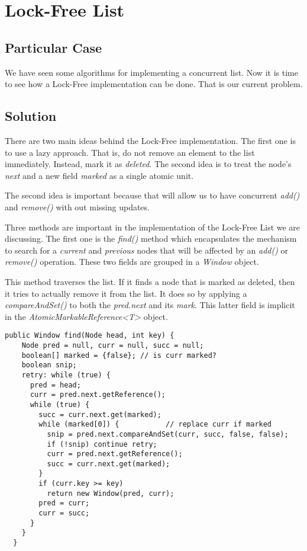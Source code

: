 \section{\textbf{Lock-Free List}}
\subsection{Particular Case}
\par
We have seen some algorithms for implementing a concurrent list. Now it is time
to see how a Lock-Free implementation can be done. That is our current problem.
\par
\subsection{Solution}
\par
There are two main ideas behind the Lock-Free implementation. The first one is
to use a lazy approach. That is, do not remove an element to the list
immediately. Instead, mark it as \textit{deleted}. The second idea is to treat the node's
\textit{next} and a new field \textit{marked} as a single atomic unit. 
\par
The second idea is important because that will allow us to have concurrent
\textit{add()} and \textit{remove()} with out missing updates.
\par
Three methods are important in the implementation of the Lock-Free List we are
discussing. The first one is the \textit{find()} method which encapsulates the
mechanism to search for a \textit{current} and \textit{previous} nodes that will
be affected by an \textit{add()} or \textit{remove()} operation. These two
fields are grouped in a \textit{Window} object.
\par
This method traverses the list. If it finds a node that is marked as deleted,
then it tries to actually remove it from the list. It does so by applying a
\textit{compareAndSet()} to both the \textit{pred.next} and its \textit{mark}.
This latter field is implicit in the \textit{AtomicMarkableReference<T>} object.
\par
\hfill
\begin{lstlisting}[style=numbers]
  public Window find(Node head, int key) {
    Node pred = null, curr = null, succ = null;
    boolean[] marked = {false}; // is curr marked?
    boolean snip;
    retry: while (true) {
      pred = head;
      curr = pred.next.getReference();
      while (true) {
        succ = curr.next.get(marked); 
        while (marked[0]) {           // replace curr if marked
          snip = pred.next.compareAndSet(curr, succ, false, false);
          if (!snip) continue retry;
          curr = pred.next.getReference();
          succ = curr.next.get(marked);
        }
        if (curr.key >= key)
          return new Window(pred, curr);
        pred = curr;
        curr = succ;
      }
    }
  }
\end{lstlisting}
